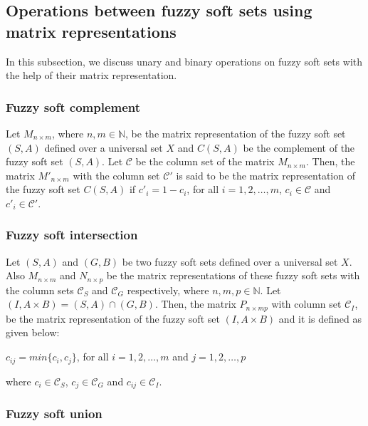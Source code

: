 \documentclass{article}
\theoremstyle{definition}
\begin{document}
  \subsection{Operations between fuzzy soft sets using matrix representations}

  In this subsection, we discuss unary and binary operations on fuzzy soft sets with the help of their matrix representation.

  \subsubsection{Fuzzy soft complement}

  Let $M_{n\times m}$, where $n,m \in \mathbb{N}$, be the matrix representation of the fuzzy soft set $(S,A)$ defined over a universal set $X$ and $C(S,A)$ be the complement of the fuzzy soft set $(S,A)$. Let $\mathcal{C}$ be the column set of the matrix $M_{n\times m}$. Then, the matrix $M'_{n\times m}$ with the column set $\mathcal{C'}$ is said to be the matrix representation of the fuzzy soft set $C(S,A)$ if $c'_i=1-{c_i}$, for all $i=1, 2, \dots, m$, $c_i \in \mathcal{C}$ and $c'_i \in \mathcal{C'}$.

  \subsubsection{Fuzzy soft intersection}

  Let $(S,A)$ and $(G,B)$ be two fuzzy soft sets defined over a universal set $X$. Also $M_{n\times m}$ and $N_{n\times p}$ be the matrix representations of these fuzzy soft sets with the column sets ${\mathcal{C}}_S$ and ${\mathcal{C}}_G$ respectively, where $n, m, p \in \mathbb{N}$. Let $(I, A\times B)=(S,A) \cap (G,B)$. Then, the matrix $P_{n\times mp}$ with column set ${\mathcal{C}}_I$, be the matrix representation of the fuzzy soft set $(I,A\times B)$ and it is defined as given below:
  \begin{center}
      $c_{ij}=min\{c_i, c_j\}$, for all $i=1, 2, \dots, m$ and $j=1, 2, \dots, p$
  \end{center}
where $c_i \in {\mathcal{C}}_S$, $c_j \in {\mathcal{C}}_G$ and $c_{ij} \in {\mathcal{C}}_I$.


   \subsubsection{Fuzzy soft union}
\end{document}
